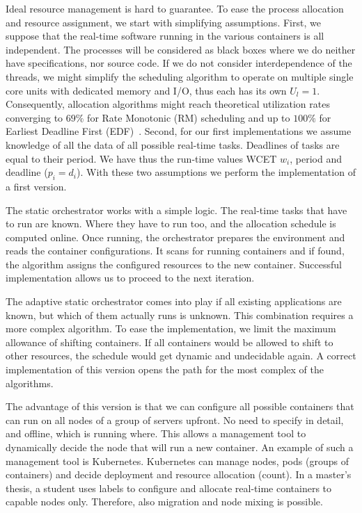 \documentclass[]{scrartcl}
\begin{document}
Ideal resource management is hard to guarantee.
To ease the process allocation and resource assignment, we start with simplifying assumptions.
First, we suppose that the real-time software running in the various containers is all independent. 
The processes will be considered as black boxes where we do neither have specifications, nor source code.
If we do not consider interdependence of the threads, we might simplify the scheduling algorithm to operate on multiple single core units with dedicated memory and I/O, thus each has its own $U_l = 1$.
Consequently, allocation algorithms might reach theoretical utilization rates converging to $69\%$ for Rate Monotonic (RM) scheduling and up to $100\%$ for Earliest Deadline First (EDF)~\cite{Buttazzo2011}. 
Second, for our first implementations we assume knowledge of all the data of all possible real-time tasks.
Deadlines of tasks are equal to their period.
We have thus the run-time values WCET $w_i$, period and deadline ($p_i = d_i$).
With these two assumptions we perform the implementation of a first version. 

The static orchestrator works with a simple logic. 
The real-time tasks that have to run are known. Where they have to run too, and the allocation schedule is computed online. 
Once running, the orchestrator prepares the environment and reads the container configurations.
It scans for running containers and if found, the algorithm assigns the configured resources to the new container.
Successful implementation allows us to proceed to the next iteration.

The adaptive static orchestrator comes into play if all existing applications are known, but which of them actually runs is unknown. 
This combination requires a more complex algorithm.
To ease the implementation, we limit the maximum allowance of shifting containers.
If all containers would be allowed to shift to other resources, the schedule would get dynamic and  undecidable again.
A correct implementation of this version opens the path for the most complex of the algorithms.

The advantage of this version is that we can configure all possible containers that can run on all nodes of a group of servers upfront.
No need to specify in detail, and offline, which is running where.
This allows a management tool to dynamically decide the node that will run a new container.
An example of such a management tool is Kubernetes. 
Kubernetes can manage nodes, pods (groups of containers) and decide deployment and resource allocation (count).
In a master's thesis, a student uses labels to configure and allocate real-time containers to capable nodes only.
Therefore, also migration and node mixing is possible.
\end{document}
